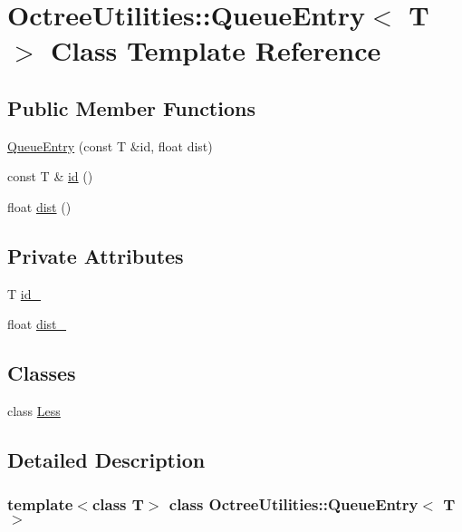 \hypertarget{class_octree_utilities_1_1_queue_entry}{
\section{OctreeUtilities::QueueEntry$<$ T $>$ Class Template Reference}
\label{class_octree_utilities_1_1_queue_entry}
}
\subsection*{Public Member Functions}
\begin{CompactItemize}
\item 
\hyperlink{class_octree_utilities_1_1_queue_entry_4b3001a35f246edecbe10537592f2dd1}{QueueEntry} (const T \&id, float dist)
\item 
const T \& \hyperlink{class_octree_utilities_1_1_queue_entry_352779fe64b13308ee400471ed9c1706}{id} ()
\item 
float \hyperlink{class_octree_utilities_1_1_queue_entry_3e71be860b89a0f4fd267c6357379cd8}{dist} ()
\end{CompactItemize}
\subsection*{Private Attributes}
\begin{CompactItemize}
\item 
T \hyperlink{class_octree_utilities_1_1_queue_entry_e6484d99214e495d595ac287694e9d31}{id\_\-}
\item 
float \hyperlink{class_octree_utilities_1_1_queue_entry_80e3dbbc0d9529e1068dd13db3501a04}{dist\_\-}
\end{CompactItemize}
\subsection*{Classes}
\begin{CompactItemize}
\item 
class \hyperlink{class_octree_utilities_1_1_queue_entry_1_1_less}{Less}
\end{CompactItemize}


\subsection{Detailed Description}
\subsubsection*{template$<$class T$>$ class OctreeUtilities::QueueEntry$<$ T $>$}

